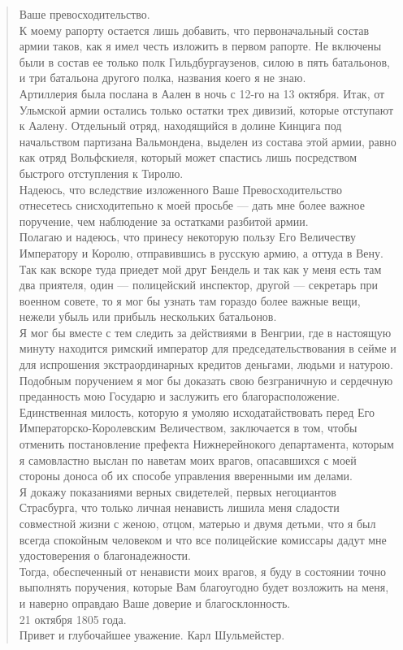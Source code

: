 \documentclass[
  oneside,
  12pt,
  titlepage]{book}
\begin{document}
\begin{quote}
Ваше превосходительство.\\
К моему рапорту остается лишь добавить, что первоначальный состав армии таков, как я имел честь изложить в первом рапорте. Не включены были в состав ее только полк Гильдбургаузенов, силою в пять батальонов, и три батальона другого полка, названия коего я не знаю.\\
Артиллерия была послана в Аален в ночь с 12-го на 13 октября. Итак, от Ульмской армии остались только остатки трех дивизий, которые отступают к Аалену. Отдельный отряд, находящийся в долине Кинцига под начальством партизана Вальмондена, выделен из состава этой армии, равно как отряд Вольфскиеля, который может спастись лишь посредством быстрого отступления к Тиролю.\\
Надеюсь, что вследствие изложенного Ваше Превосходительство отнесетесь снисходитепьно к моей просьбе --- дать мне более важное поручение, чем наблюдение за остатками разбитой армии.\\
Полагаю и надеюсь, что принесу некоторую пользу Его Величеству Императору и Королю, отправившись в русскую армию, а оттуда в Вену. Так как вскоре туда приедет мой друг Бендель и так как у меня есть там два приятеля, один --- полицейский инспектор, другой --- секретарь при военном совете, то я мог бы узнать там гораздо более важные вещи, нежели убыль или прибыль нескольких батальонов.\\
Я мог бы вместе с тем следить за действиями в Венгрии, где в настоящую минуту находится римский император для председательствования в сейме и для испрошения экстраординарных кредитов деньгами, людьми и натурою. Подобным поручением я мог бы доказать свою безграничную и сердечную преданность мою Государю и заслужить его благорасположение.\\
Единственная милость, которую я умоляю исходатайствовать перед Его Императорско-Королевским Величеством, заключается в том, чтобы отменить постановление префекта Нижнерейнокого департамента, которым я самовластно выслан по наветам моих врагов, опасавшихся с моей стороны доноса об их способе управления вверенными им делами.\\
Я докажу показаниями верных свидетелей, первых негоциантов Страсбурга, что только личная ненависть лишила меня сладости совместной жизни с женою, отцом, матерью и двумя детьми, что я был всегда спокойным человеком и что все полицейские комиссары дадут мне удостоверения о благонадежности.\\
Тогда, обеспеченный от ненависти моих врагов, я буду в состоянии точно выполнять поручения, которые Вам благоугодно будет возложить на меня, и наверно оправдаю Ваше доверие и благосклонность.\\
21 октября 1805 года.\\
Привет и глубочайшее уважение. Карл Шульмейстер.
\end{quote}
\end{document}
